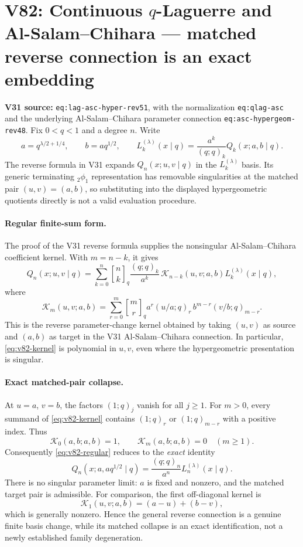 \documentclass[11pt]{article}
\begin{document}
\section{V82: Continuous $q$-Laguerre and Al-Salam--Chihara --- matched reverse connection is an exact embedding}
\noindent\textbf{V31 source:} \texttt{eq:lag-asc-hyper-rev51}, with the normalization \texttt{eq:qlag-asc} and the underlying Al-Salam--Chihara parameter connection \texttt{eq:asc-hypergeom-rev48}.
Fix $0<q<1$ and a degree $n$. Write
\[
 a=q^{\lambda/2+1/4},\qquad b=aq^{1/2},\qquad
 L_k^{(\lambda)}(x\mid q)=\frac{a^k}{(q;q)_k}Q_k(x;a,b\mid q).
\]
The reverse formula in V31 expands $Q_n(x;u,v\mid q)$ in the
$L_k^{(\lambda)}$ basis. Its generic terminating ${}_2\phi_1$
representation has removable singularities at the matched pair
$(u,v)=(a,b)$, so substituting into the displayed hypergeometric
quotients directly is not a valid evaluation procedure.

\paragraph{Regular finite-sum form.}
The proof of the V31 reverse formula supplies the nonsingular
Al-Salam--Chihara coefficient kernel. With $m=n-k$, it gives
\begin{equation}\label{eq:v82-regular}
 Q_n(x;u,v\mid q)=\sum_{k=0}^n {n\brack k}_q
 \frac{(q;q)_k}{a^k}\,\mathcal K_{n-k}(u,v;a,b)
 L_k^{(\lambda)}(x\mid q),
\end{equation}
where
\begin{equation}\label{eq:v82-kernel}
 \mathcal K_m(u,v;a,b)=
 \sum_{r=0}^m {m\brack r}_q
 a^r(u/a;q)_r\,b^{m-r}(v/b;q)_{m-r}.
\end{equation}
This is the reverse parameter-change kernel obtained by taking
$(u,v)$ as source and $(a,b)$ as target in the V31 Al-Salam--Chihara
connection. In particular, \eqref{eq:v82-kernel} is polynomial in
$u,v$, even where the hypergeometric presentation is singular.

\paragraph{Exact matched-pair collapse.}
At $u=a$, $v=b$, the factors $(1;q)_j$ vanish for all $j\ge1$.
For $m>0$, every summand of \eqref{eq:v82-kernel} contains
$(1;q)_r$ or $(1;q)_{m-r}$ with a positive index. Thus
\[
 \mathcal K_0(a,b;a,b)=1,\qquad
 \mathcal K_m(a,b;a,b)=0\quad(m\ge1).
\]
Consequently \eqref{eq:v82-regular} reduces to the \emph{exact}
identity
\begin{equation}\label{eq:v82-exact}
 Q_n(x;a,aq^{1/2}\mid q)=\frac{(q;q)_n}{a^n}
 L_n^{(\lambda)}(x\mid q).
\end{equation}
There is no singular parameter limit: $a$ is fixed and nonzero,
and the matched target pair is admissible. For comparison, the
first off-diagonal kernel is
\[
 \mathcal K_1(u,v;a,b)=(a-u)+(b-v),
\]
which is generally nonzero. Hence the general reverse connection
is a genuine finite basis change, while its matched collapse is an
exact identification, not a newly established family degeneration.
\end{document}
